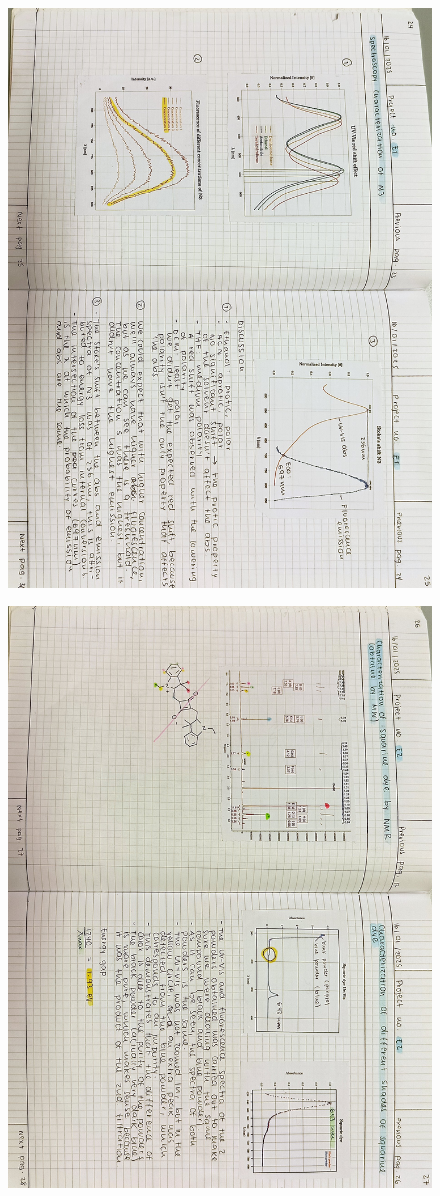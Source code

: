 \begin{figure}[H]
	\centering
	\includegraphics[width=0.6\linewidth, angle=90]{../images/compressed/IMG20250123173027.jpg}
\end{figure}
\begin{figure}[H]
	\centering
	\includegraphics[width=0.6\linewidth, angle=90]{../images/compressed/IMG20250123173032.jpg}
\end{figure}
